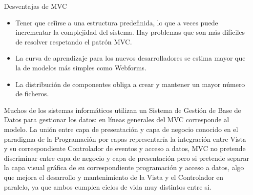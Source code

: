 \documentclass[10pt,a4paper]{report}
\begin{document}
Desventajas de MVC\

\begin{itemize}
\item Tener que ce\~{i}irse a una estructura predefinida, lo que a veces puede incrementar la complejidad del sistema. Hay problemas que son m\'{a}s difíciles de resolver respetando el patr\'{o}n MVC.
\item La curva de aprendizaje para los nuevos desarrolladores se estima mayor que la de modelos m\'{a}s simples como Webforms.
\item La distribuci\'{o}n de componentes obliga a crear y mantener un mayor n\'{u}mero de ficheros.
\end{itemize}
\bigskip
Muchos de los sistemas inform\'{a}ticos utilizan un Sistema de Gesti\'{o}n de Base de Datos para gestionar los datos: en l\'{i}neas generales del MVC corresponde al modelo. La uni\'{o}n entre capa de presentaci\'{o}n y capa de negocio conocido en el paradigma de la Programaci\'{o}n por capas representar\'{i}a la integraci\'{o}n entre Vista y su correspondiente Controlador de eventos y acceso a datos, MVC no pretende discriminar entre capa de negocio y capa de presentaci\'{o}n pero si pretende separar la capa visual gr\'{a}fica de su correspondiente programaci\'{o}n y acceso a datos, algo que mejora el desarrollo y mantenimiento de la Vista y el Controlador en paralelo, ya que ambos cumplen ciclos de vida muy distintos entre s\'{i}.
\end{document}
